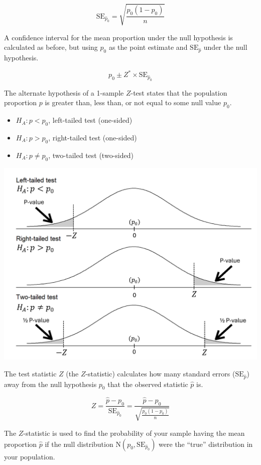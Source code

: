 \documentclass[
  letterpaper,
  DIV=11,
  numbers=noendperiod]{scrartcl}
\begin{document}
\[
\text{SE}_{\hat{p}_0}=\sqrt{\frac{p_0(1-p_0)}{n}}
\]

A confidence interval for the mean proportion under the null hypothesis
is calculated as before, but using \(p_0\) as the point estimate and
\(\text{SE}_{\hat{p}}\) under the null hypothesis.

\[
p_0 \pm Z^* \times \text{SE}_{\hat{p}_0}
\]

The alternate hypothesis of a 1-sample \(Z\)-test states that the
population proportion \(p\) is greater than, less than, or not equal to
some null value \(p_0\).

\begin{itemize}
\item
  \(H_A \colon p < p_0\), left-tailed test (one-sided)
\item
  \(H_A \colon p > p_0\), right-tailed test (one-sided)
\item
  \(H_A \colon p \ne p_0\), two-tailed test (two-sided)
\end{itemize}

\includegraphics{cheatsheet_files/mediabag/z-test.png}

The test statistic \(Z\) (the \(Z\)-statistic) calculates how many
standard errors (\(\text{SE}_{\hat{p}}\)) away from the null hypothesis
\(p_0\) that the observed statistic \(\hat{p}\) is.

\[
Z=\frac{\hat{p}-p_0}{\text{SE}_{\hat{p}_0}}=\frac{\hat{p}-p_0}{\sqrt{\frac{p_0(1-p_0)}{n}}}
\]

The \(Z\)-statistic is used to find the probability of your sample
having the mean proportion \(\hat{p}\) if the null distribution
\(\text{N}\left(p_0, \text{SE}_{\hat{p}_0}\right)\) were the ``true''
distribution in your population.
\end{document}

